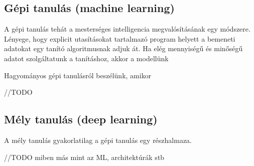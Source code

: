 \subsection{Gépi tanulás (machine learning)}

A gépi tanulás tehát a mesterséges intelligencia megvalósításának egy módszere. Lényege, hogy explicit utasításokat tartalmazó program helyett a bemeneti adatokat egy tanító algoritmusnak adjuk át. Ha elég mennyiségű és minőségű adatot szolgáltatunk a tanításhoz, akkor a modellünk 

Hagyományos gépi tanulásról beszélünk, amikor 

//TODO


\subsection{Mély tanulás (deep learning)}

A mély tanulás gyakorlatilag a gépi tanulás egy részhalmaza. 

//TODO  miben más mint az ML, architektúrák stb